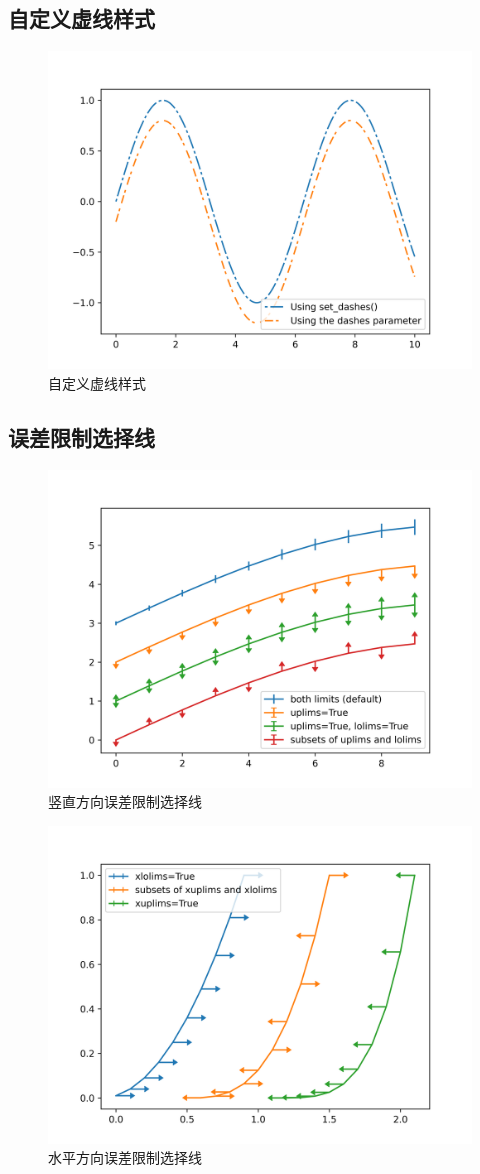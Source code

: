\documentclass[openany]{progbookcn}
\begin{document}
\subsection{自定义虚线样式}

\begin{figure}[H]
\centering
\includegraphics[width=0.6 \textwidth]{figs/chapter9/lines/CustomizeLineStyle}
\caption{自定义虚线样式}
\end{figure}
\subsection{误差限制选择线}

\begin{figure}[H]
\centering
\includegraphics[width=0.6 \textwidth]{figs/chapter9/lines/UpLowErrorBar}
\caption{竖直方向误差限制选择线}
\end{figure}

\begin{figure}[H]
\centering
\includegraphics[width=0.6 \textwidth]{figs/chapter9/lines/XYErrorBar}
\caption{水平方向误差限制选择线}
\end{figure}
\end{document}
